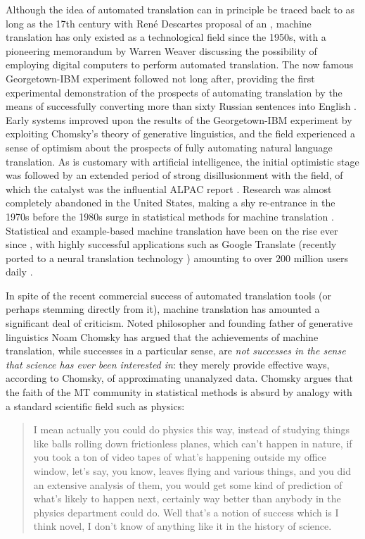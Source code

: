 \documentclass{article}
\begin{document}
Although the idea of automated translation can in principle be traced back to as long as the 17th century with René Descartes proposal of an  \cite{dascal1982universal}, machine translation has only existed as a technological field since the 1950s, with a pioneering memorandum by Warren Weaver \cite{weaver1955translation} discussing the possibility of employing digital computers to perform automated translation. The now famous Georgetown-IBM experiment followed not long after, providing the first experimental demonstration of the prospects of automating translation by the means of successfully converting more than sixty Russian sentences into English \cite{gordin2015scientific}. Early systems improved upon the results of the Georgetown-IBM experiment by exploiting Chomsky's theory of generative linguistics, and the field experienced a sense of optimism about the prospects of fully automating natural language translation. As is customary with artificial intelligence, the initial optimistic stage was followed by an extended period of strong disillusionment with the field, of which the catalyst was the influential ALPAC report \cite{hutchins1986machine}. Research was almost completely abandoned in the United States, making a shy re-entrance in the 1970s before the 1980s surge in statistical methods for machine translation \cite{koehn2009statistical}. Statistical and example-based machine translation have been on the rise ever since \cite{carl2003recent}, with highly successful applications such as Google Translate (recently ported to a neural translation technology \cite{wu2016google,gtranslateneuralnet2017}) amounting to over $200$ million users daily \cite{gtranslateneuralnet2017,gtranslatezeroshot2017}.

In spite of the recent commercial success of automated translation tools (or perhaps stemming directly from it), machine translation has amounted a significant deal of criticism. Noted philosopher and founding father of generative linguistics Noam Chomsky has argued that the achievements of machine translation, while successes in a particular sense, are \emph{not successes in the sense that science has ever been interested in}: they merely provide effective ways, according to Chomsky, of approximating unanalyzed data. Chomsky argues that the faith of the MT community in statistical methods is absurd by analogy with a standard scientific field such as physics:

\begin{quotation}
I mean actually you could do physics this way, instead of studying things like balls rolling down frictionless planes, which can't happen in nature, if you took a ton of video tapes of what's happening outside my office window, let's say, you know, leaves flying and various things, and you did an extensive analysis of them, you would get some kind of prediction of what's likely to happen next, certainly way better than anybody in the physics department could do. Well that's a notion of success which is I think novel, I don't know of anything like it in the history of science.
\end{quotation}
\end{document}
